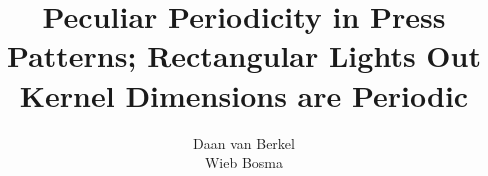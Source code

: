 \title{Peculiar Periodicity in Press Patterns; Rectangular Lights Out Kernel Dimensions are Periodic}
\author{Daan van Berkel\\Wieb Bosma}
